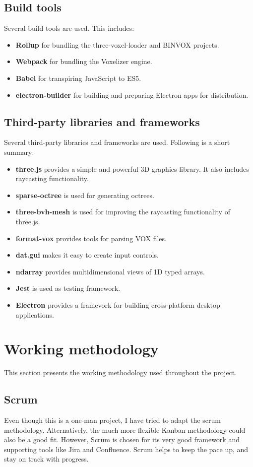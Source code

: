 \subsection{Build tools}
Several build tools are used. This includes:
\begin{itemize}
    \item \textbf{Rollup} for bundling the three-voxel-loader and BINVOX projects.
    \item \textbf{Webpack} for bundling the Voxelizer engine.
    \item \textbf{Babel} for transpiring JavaScript to ES5.
    \item \textbf{electron-builder} for building and preparing Electron apps for distribution.
\end{itemize}

\subsection{Third-party libraries and frameworks}
Several third-party libraries and frameworks are used. Following is a short summary:
\begin{itemize}
    \item \textbf{three.js} provides a simple and powerful 3D graphics library. It also includes raycasting functionality.
    \item \textbf{sparse-octree} is used for generating octrees.
    \item \textbf{three-bvh-mesh} is used for improving the raycasting functionality of three.js.
    \item \textbf{format-vox} provides tools for parsing VOX files.
    \item \textbf{dat.gui} makes it easy to create input controls.
    \item \textbf{ndarray} provides multidimensional views of 1D typed arrays.
    \item \textbf{Jest} is used as testing framework.
    \item \textbf{Electron} provides a framevork for building cross-platform desktop applications.
\end{itemize}

\section{Working methodology}
\label{sec:method-working-methodology}
This section presents the working methodology used throughout the project.
\subsection{Scrum}
\label{sec:method-scrum}
Even though this is a one-man project, I have tried to adapt the scrum methodology. Alternatively, the much more flexible Kanban methodology could also be a good fit. However, Scrum is chosen for its very good framework and supporting tools like Jira and Confluence. Scrum helps to keep the pace up, and stay on track with progress.

